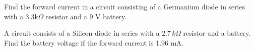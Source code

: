 \smallskip
\begin{example}\label{exam1.10}
Find the forward current in a circuit consisting of a Germanium diode
in series with a 3.3k$\Omega$ resistor and a 9 V battery.
\end{example}


\eject

\begin{example}\label{exam1.11}
A circuit consists of a Silicon diode in series with a $2.7\,k\Omega$ resistor
and a battery. Find the  battery voltage if the forward current is
1.96 mA.
\end{example}

